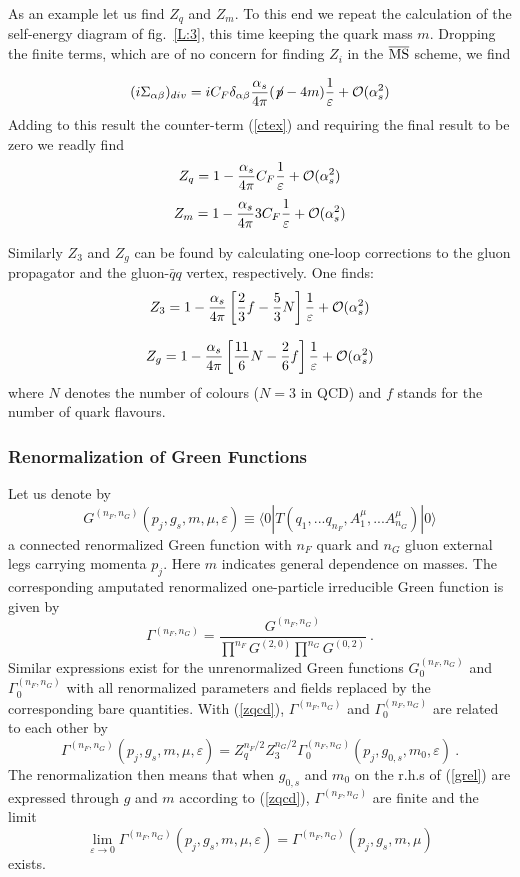 \documentclass[12pt,rotate]{article}
\def\eps{\varepsilon}
\newcommand{\be}{\begin{equation}}
\newcommand{\ee}{\end{equation}}
\begin{document}
\begin{itemize}
As an example let us find $Z_q$ and $Z_m$. To this end we repeat the
calculation of the self-energy diagram of fig.~\ref{L:3}, this time keeping
the quark mass $m$. Dropping the finite terms, which are of no concern
for finding $Z_i$ in the $\overline{\rm MS}$ scheme, we find

\begin{equation}\label{sigma}
(i \Sigma_{\alpha\beta})_{div}=i C_F \delta_{\alpha\beta}  
\frac{\alpha_s}{4\pi}( \not\! p-4 m)
 \frac{1}{\varepsilon}+{\cal O}(\alpha_s^2) 
\end{equation}
Adding to this result the counter-term (\ref{ctex}) and requiring
the final result to be zero we readly find
\begin{equation}\label{zq0}
Z_q=1- \frac{\alpha_s}{4\pi} C_F \frac{1}{\varepsilon}+ {\cal O}(\alpha_s^2) 
\ee
\be\label{zm}
Z_m=1- \frac{\alpha_s}{4\pi} 3 C_F \frac{1}{\varepsilon}+{\cal O}(\alpha_s^2) 
\end{equation}

Similarly $Z_3$ and $Z_g$ can be found by calculating one-loop corrections
to the gluon propagator and the gluon-$\bar q q$ vertex, respectively.
One finds:
\begin{equation}
Z_3=1- \frac{\alpha_s}{4\pi}\left[\frac{2}{3}f-\frac{5}{3}N \right]
 \frac{1}{\varepsilon}+ {\cal O}(\alpha_s^2) 
\end{equation}

\begin{equation}\label{zg}
Z_g=1- \frac{\alpha_s}{4\pi}\left[\frac{11}{6}N-\frac{2}{6}f \right]
 \frac{1}{\varepsilon}+ {\cal O}(\alpha_s^2) 
\end{equation}
where $N$ denotes the number of colours ($N=3$ in QCD) and $f$ stands
for the number of quark flavours.
\subsubsection{Renormalization of Green Functions}
Let us denote by
\be\label{cgreen}
G^{(n_F,n_G)}(p_j,g_s,m,\mu,\eps)\equiv
\langle 0|T(q_1,...q_{n_F},A^\mu_1,...A^\mu_{n_G})|0\rangle
\ee
a connected renormalized Green function with $n_F$ quark and
$n_G$ gluon external legs carrying momenta $p_j$. Here $m$
indicates general dependence on masses. The corresponding
amputated renormalized one-particle irreducible Green function is 
given by
\be\label{ampgreen}
\Gamma^{(n_F,n_G)}=\frac{G^{(n_F,n_G)}}
{\prod^{n_F}G^{(2,0)}\prod^{n_G}G^{(0,2)}}~.
\ee
Similar expressions exist for the unrenormalized Green functions
$G_0^{(n_F,n_G)}$ and $\Gamma_0^{(n_F,n_G)}$ with all renormalized 
parameters and fields replaced by the corresponding bare quantities.
With (\ref{zqcd}),  $\Gamma^{(n_F,n_G)}$ and  
$\Gamma_0^{(n_F,n_G)}$ are related to each other by
\be\label{grel}
\Gamma^{(n_F,n_G)}(p_j,g_s,m,\mu,\eps)=Z_q^{n_F/2}Z_3^{n_G/2}
\Gamma_0^{(n_F,n_G)}(p_j,g_{0,s},m_0,\eps)~.
\ee
The renormalization then means that when $g_{0,s}$ and $m_0$ on the
r.h.s of (\ref{grel}) are expressed through $g$ and $m$ according to
(\ref{zqcd}), $\Gamma^{(n_F,n_G)}$ are finite and the limit
\be
\lim_{\eps\to 0} \Gamma^{(n_F,n_G)}(p_j,g_s,m,\mu,\eps)=
\Gamma^{(n_F,n_G)}(p_j,g_s,m,\mu)
\ee
exists.


\end{itemize}
\end{document}
